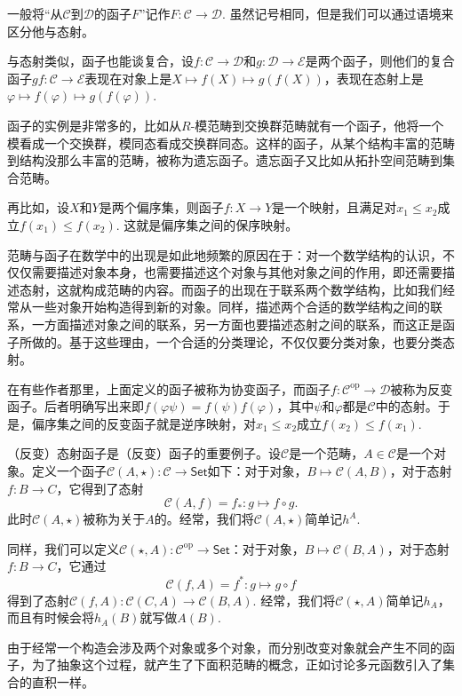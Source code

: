 一般将“从$\mathcal{C}$到$\mathcal{D}$的函子$F$”记作$F:\mathcal{C}\to \mathcal{D}$. 虽然记号相同，但是我们可以通过语境来区分他与态射。

与态射类似，函子也能谈复合，设$f:\mathcal{C}\to \mathcal{D}$和$g:\mathcal{D}\to \mathcal{E}$是两个函子，则他们的复合函子$gf:\mathcal{C}\to \mathcal{E}$表现在对象上是$X\mapsto f(X)\mapsto g(f(X))$，表现在态射上是$\varphi\mapsto f(\varphi)\mapsto g(f(\varphi))$. 
\endpara

函子的实例是非常多的，比如从$R$-模范畴到交换群范畴就有一个函子，他将一个模看成一个交换群，模同态看成交换群同态。这样的函子，从某个结构丰富的范畴到结构没那么丰富的范畴，被称为遗忘函子。遗忘函子又比如从拓扑空间范畴到集合范畴。

再比如，设$X$和$Y$是两个偏序集，则函子$f:X\to Y$是一个映射，且满足对$x_1\leq x_2$成立$f(x_1)\leq f(x_2)$. 这就是偏序集之间的保序映射。

范畴与函子在数学中的出现是如此地频繁的原因在于：对一个数学结构的认识，不仅仅需要描述对象本身，也需要描述这个对象与其他对象之间的作用，即还需要描述态射，这就构成范畴的内容。而函子的出现在于联系两个数学结构，比如我们经常从一些对象开始构造得到新的对象。同样，描述两个合适的数学结构之间的联系，一方面描述对象之间的联系，另一方面也要描述态射之间的联系，而这正是函子所做的。基于这些理由，一个合适的分类理论，不仅仅要分类对象，也要分类态射。

在有些作者那里，上面定义的函子被称为协变函子，而函子$f:\mathcal{C}^{\mathrm{op}} \to \mathcal{D}$被称为反变函子。后者明确写出来即$f(\varphi\psi)=f(\psi)f(\varphi)$，其中$\psi$和$\varphi$都是$\mathcal{C}$中的态射。于是，偏序集之间的反变函子就是逆序映射，对$x_1\leq x_2$成立$f(x_2)\leq f(x_1)$.

\para[态射函子] （反变）态射函子是（反变）函子的重要例子。设$\mathcal{C}$是一个范畴，$A\in \mathcal{C}$是一个对象。定义一个函子$\mathcal{C}(A,\star):\mathcal{C}\to \mathsf{Set}$如下：对于对象，$B\mapsto \mathcal{C}(A,B)$，对于态射$f:B\to C$，它得到了态射
\[
	\mathcal{C}(A,f)=f_*: g\mapsto f\circ g.
\]
此时$\mathcal{C}(A,\star)$被称为关于$A$的。经常，我们将$\mathcal{C}(A,\star)$简单记$h^A$.

同样，我们可以定义$\mathcal{C}(\star,A):\mathcal{C}^{\text{op}}\to \mathsf{Set}$：对于对象，$B\mapsto \mathcal{C}(B,A)$，对于态射$f:B\to C$，它通过
\[
	\mathcal{C}(f,A)=f^*: g\mapsto g\circ f
\]
得到了态射$\mathcal{C}(f,A):\mathcal{C}(C,A)\to \mathcal{C}(B,A)$. 经常，我们将$\mathcal{C}(\star,A)$简单记$h_A$，而且有时候会将$h_A(B)$就写做$A(B)$.

\para[积范畴与双函子] 由于经常一个构造会涉及两个对象或多个对象，而分别改变对象就会产生不同的函子，为了抽象这个过程，就产生了下面积范畴的概念，正如讨论多元函数引入了集合的直积一样。


